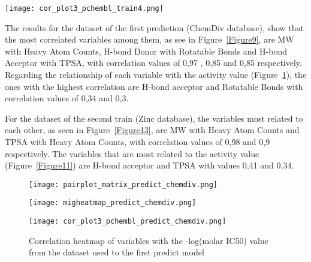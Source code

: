 \documentclass[final,times,twocolumn,article]{elsarticle}
\begin{document}
\begin{figure*}
    \centering 
     \texttt{[image: cor\_plot3\_pchembl\_train4.png]}	
     \caption{Correlation heatmap of variables with the -log(molar IC50) value from the dataset used to train the model} 
     \label{Figure8}
 \end{figure*}

 The results for the dataset of the first prediction (ChemDiv database), show that the most correlated variables among them, as see in Figure~\ref{Figure9}, are MW with Heavy Atom Counts, H-bond Donor with Rotatable Bonds and H-bond Acceptor with TPSA, with correlation values of 0,97 , 0,85 and 0,85 respectively. Regarding the relationship of each variable with the activity value (Figure~\ref{Figure10}), the ones with the highest correlation are H-bond acceptor and Rotatable Bonds with correlation values of 0,34 and 0,3. 

 For the dataset of the second train (Zinc database), the variables most related to each other, as seen in Figure~\ref{Figure13}, are MW with Heavy Atom Counts and TPSA with Heavy Atom Counts, with correlation values of 0,98 and 0,9 respectively. The variables that are most related to the activity value (Figure~\ref{Figure11}) are H-bond acceptor and TPSA with values 0,41 and 0,34. 

\begin{figure*}
    \begin{subfigure}{0.6\textwidth}
        \texttt{[image: pairplot\_matrix\_predict\_chemdiv.png]} 
        \caption{}
    \end{subfigure}
    \hfill
    \begin{subfigure}{0.6\textwidth}
        \texttt{[image: migheatmap\_predict\_chemdiv.png]}
        \caption{}
    \end{subfigure}
    
    \caption{Correlation analysis from the dataset used to the first predict model (ChemDiv). (a)Pariplot correlation matrix (b)Correlation matrix heatmap}
    \label{Figure9}
\end{figure*}

\begin{figure}[h]
    \centering 
     \texttt{[image: cor\_plot3\_pchembl\_predict\_chemdiv.png]}	
     \caption{Correlation heatmap of variables with the -log(molar IC50) value from the dataset used to the first predict model} 
     \label{Figure10}
 \end{figure}
\end{document}
